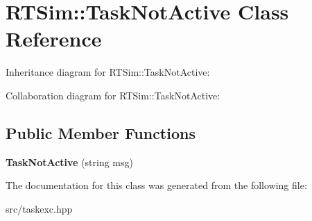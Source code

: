 \hypertarget{classRTSim_1_1TaskNotActive}{}\section{R\+T\+Sim\+:\+:Task\+Not\+Active Class Reference}
\label{classRTSim_1_1TaskNotActive}


Inheritance diagram for R\+T\+Sim\+:\+:Task\+Not\+Active\+:


Collaboration diagram for R\+T\+Sim\+:\+:Task\+Not\+Active\+:
\subsection*{Public Member Functions}
\begin{DoxyCompactItemize}
\item 
{\bfseries Task\+Not\+Active} (string msg)\hypertarget{classRTSim_1_1TaskNotActive_a22e641d4a9ae3cdd0cea2809de834b66}{}\label{classRTSim_1_1TaskNotActive_a22e641d4a9ae3cdd0cea2809de834b66}

\end{DoxyCompactItemize}


The documentation for this class was generated from the following file\+:\begin{DoxyCompactItemize}
\item 
src/taskexc.\+hpp\end{DoxyCompactItemize}
